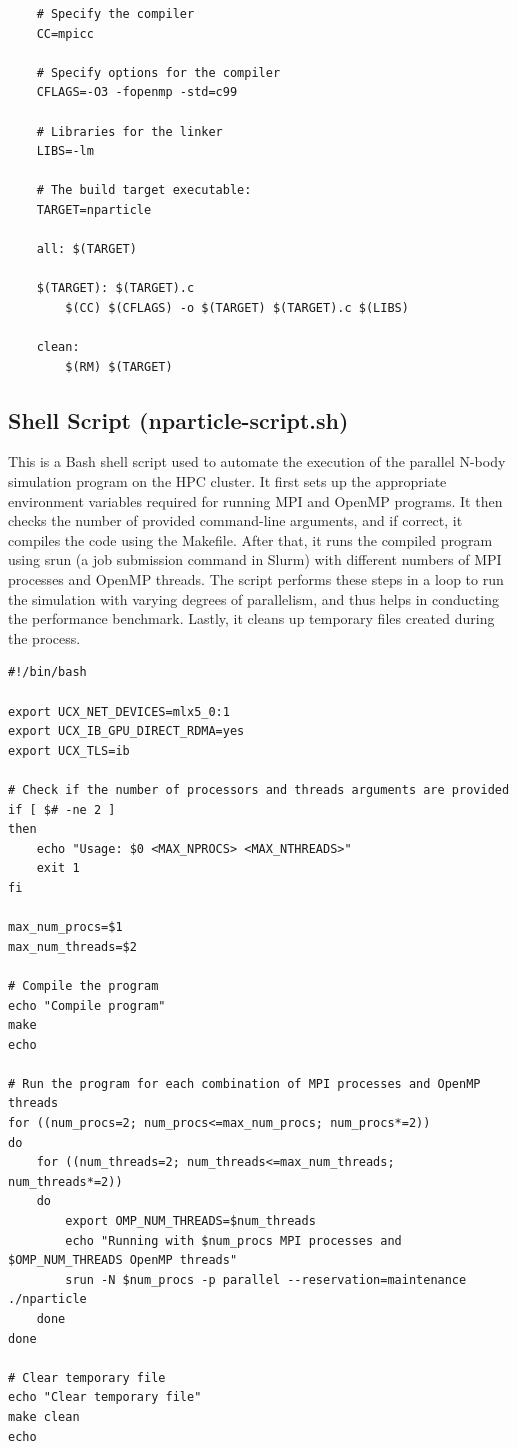 \documentclass{solutionclass} %
\begin{document}
\begin{verbatim}
    # Specify the compiler
    CC=mpicc
    
    # Specify options for the compiler
    CFLAGS=-O3 -fopenmp -std=c99
    
    # Libraries for the linker
    LIBS=-lm
    
    # The build target executable:
    TARGET=nparticle
    
    all: $(TARGET)
    
    $(TARGET): $(TARGET).c
    	$(CC) $(CFLAGS) -o $(TARGET) $(TARGET).c $(LIBS)
    
    clean:
    	$(RM) $(TARGET)
\end{verbatim}

\divider

\subsection{Shell Script (nparticle-script.sh)}
This is a Bash shell script used to automate the execution of the parallel N-body simulation program on the HPC cluster. It first sets up the appropriate environment variables required for running MPI and OpenMP programs. It then checks the number of provided command-line arguments, and if correct, it compiles the code using the Makefile. After that, it runs the compiled program using srun (a job submission command in Slurm) with different numbers of MPI processes and OpenMP threads. The script performs these steps in a loop to run the simulation with varying degrees of parallelism, and thus helps in conducting the performance benchmark. Lastly, it cleans up temporary files created during the process.

\begin{verbatim}
#!/bin/bash

export UCX_NET_DEVICES=mlx5_0:1 
export UCX_IB_GPU_DIRECT_RDMA=yes 
export UCX_TLS=ib 

# Check if the number of processors and threads arguments are provided
if [ $# -ne 2 ]
then
    echo "Usage: $0 <MAX_NPROCS> <MAX_NTHREADS>"
    exit 1
fi

max_num_procs=$1
max_num_threads=$2

# Compile the program
echo "Compile program"
make
echo 

# Run the program for each combination of MPI processes and OpenMP threads
for ((num_procs=2; num_procs<=max_num_procs; num_procs*=2))
do
    for ((num_threads=2; num_threads<=max_num_threads; num_threads*=2))
    do
        export OMP_NUM_THREADS=$num_threads
        echo "Running with $num_procs MPI processes and $OMP_NUM_THREADS OpenMP threads"
        srun -N $num_procs -p parallel --reservation=maintenance ./nparticle
    done
done

# Clear temporary file
echo "Clear temporary file"
make clean
echo 
\end{verbatim}
\end{document}
